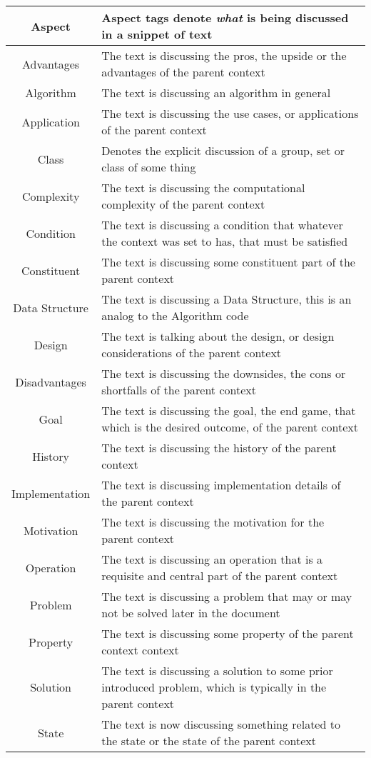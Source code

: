 \begin{table}[h!]
\begin{tabular}{c p{1.8\linewidth}}
    
    \textbf{Aspect} & Aspect tags denote \emph{what} is being discussed in a snippet of text \\
    \hline
    Advantages & The text is discussing the pros, the upside or the advantages of the parent context \\
    Algorithm & The text is discussing an algorithm in general \\
    Application &  The text is discussing the use cases, or applications of the parent context\\
    Class & Denotes the explicit discussion of a group, set or class of some thing\\
    Complexity & The text is discussing the computational complexity of the parent context\\
    Condition & The text is discussing a condition that whatever the context was set to has, that must be satisfied\\
    Constituent & The text is discussing some constituent part of the parent context\\
    Data Structure & The text is discussing a Data Structure, this is an analog to the Algorithm code\\
    Design & The text is talking about the design, or design considerations of the parent context\\
    Disadvantages & The text is discussing the downsides, the cons or shortfalls of the parent context\\
    Goal & The text is discussing the goal, the end game, that which is the desired outcome, of the parent context\\
    History & The text is discussing the history of the parent context\\
    Implementation & The text is discussing implementation details of the parent context\\
    Motivation & The text is discussing the motivation for the parent context\\
    Operation & The text is discussing an operation that is a requisite and central part of the parent context\\
    Problem & The text is discussing a problem that may or may not be solved later in the document\\
    Property & The text is discussing some property of the parent context context\\
    Solution & The text is discussing a solution to some prior introduced problem, which is typically in the parent context\\
    State & The text is now discussing something related to the state or the state of the parent context\\


\end{tabular}
\end{table}
